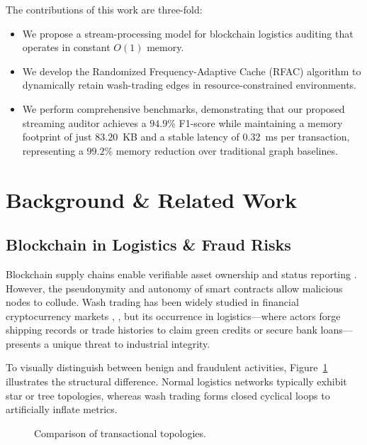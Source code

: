 \documentclass[conference]{IEEEtran}
\begin{document}
The contributions of this work are three-fold:
\begin{itemize}
    \item We propose a stream-processing model for blockchain logistics auditing that operates in constant $O(1)$ memory.
    \item We develop the Randomized Frequency-Adaptive Cache (RFAC) algorithm to dynamically retain wash-trading edges in resource-constrained environments.
    \item We perform comprehensive benchmarks, demonstrating that our proposed streaming auditor achieves a $94.9\%$ F1-score while maintaining a memory footprint of just $83.20$~KB and a stable latency of $0.32$~ms per transaction, representing a $99.2\%$ memory reduction over traditional graph baselines.
\end{itemize}

\section{Background \& Related Work}
\subsection{Blockchain in Logistics \& Fraud Risks}
Blockchain supply chains enable verifiable asset ownership and status reporting \cite{b10}. However, the pseudonymity and autonomy of smart contracts allow malicious nodes to collude. Wash trading has been widely studied in financial cryptocurrency markets \cite{b7}, \cite{b9}, but its occurrence in logistics—where actors forge shipping records or trade histories to claim green credits or secure bank loans—presents a unique threat to industrial integrity.

To visually distinguish between benign and fraudulent activities, Figure~\ref{fig_topology} illustrates the structural difference. Normal logistics networks typically exhibit star or tree topologies, whereas wash trading forms closed cyclical loops to artificially inflate metrics.

\begin{figure}[htbp]
\centering
{}
\hfil
{}
\caption{Comparison of transactional topologies.}
\label{fig_topology}
\end{figure}
\end{document}
